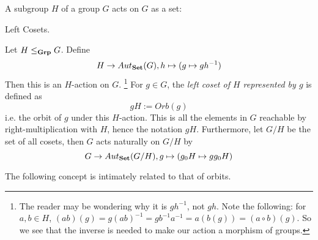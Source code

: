 \documentclass[../book.tex]{subfiles}
\begin{document}


A subgroup $H$ of a group $G$ acts on $G$ as a set: 

\begin{dfn} Left Cosets. 

    Let $H \leq_{\mathbf{Grp}} G$. 
    Define 
    \[H \to Aut_{\mathbf{Set}}(G), h \mapsto (g \mapsto gh^{-1})\]
    Then this is an $H$-action on $G$. \footnote{
        The reader may be wondering why it is $gh^{-1}$, not $gh$.
        Note the following: for $a, b \in H$, 
        $(ab)(g) = g(ab)^{-1} = gb^{-1}a^{-1} = a(b(g)) = (a \circ b)(g)$.
        So we see that the inverse is needed to make our action a morphism of groups.
    }
    For $g \in G$, 
    the \emph{left coset of $H$ represented by $g$} is defined as
    \[gH := Orb(g)\]
    i.e. the orbit of $g$ under this $H$-action. 
    This is all the elements in $G$ reachable by 
    right-multiplication with $H$, hence the notation $gH$. 
    Furthermore, let $G / H$ be the set of all cosets, 
    then $G$ acts naturally on $G / H$ by
    \[G \to Aut_{\mathbf{Set}}(G / H), g \mapsto (g_0H \mapsto gg_0H)\]
\end{dfn}

The following concept is intimately related to that of orbits. 
\end{document}
